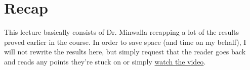 \chapter{Recap}

This lecture basically consists of Dr. Minwalla recapping a lot of the results proved earlier in the course. In order to save space (and time on my behalf), I will not rewrite the results here, but simply request that the reader goes back and reads any points they're stuck on or simply  \href{https://www.youtube.com/watch?v=FPomJFEY3B8&list=PL3PVFGnaPl_sCp2A87NVD8GT5Z8Oqw3Yr&index=22}{watch the video}. 